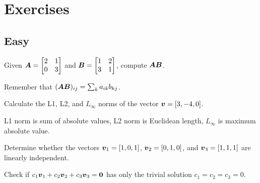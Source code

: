 
\section*{Exercises}

\subsection*{Easy}

\begin{exercisebox}[easy]
\begin{problem}
Given $\boldsymbol{A} = \begin{bmatrix} 2 & 1 \\ 0 & 3 \end{bmatrix}$ and $\boldsymbol{B} = \begin{bmatrix} 1 & 2 \\ 3 & 1 \end{bmatrix}$, compute $\boldsymbol{A}\boldsymbol{B}$.
\end{problem}
\begin{hintbox}
Remember that $(\boldsymbol{A}\boldsymbol{B})_{ij} = \sum_k a_{ik}b_{kj}$.
\end{hintbox}
\end{exercisebox}


\begin{exercisebox}[easy]
\begin{problem}
Calculate the L1, L2, and $L_\infty$ norms of the vector $\boldsymbol{v} = [3, -4, 0]$.
\end{problem}
\begin{hintbox}
L1 norm is sum of absolute values, L2 norm is Euclidean length, $L_\infty$ is maximum absolute value.
\end{hintbox}
\end{exercisebox}


\begin{exercisebox}[easy]
\begin{problem}
Determine whether the vectors $\boldsymbol{v}_1 = [1, 0, 1]$, $\boldsymbol{v}_2 = [0, 1, 0]$, and $\boldsymbol{v}_3 = [1, 1, 1]$ are linearly independent.
\end{problem}
\begin{hintbox}
Check if $c_1\boldsymbol{v}_1 + c_2\boldsymbol{v}_2 + c_3\boldsymbol{v}_3 = \boldsymbol{0}$ has only the trivial solution $c_1 = c_2 = c_3 = 0$.
\end{hintbox}
\end{exercisebox}


